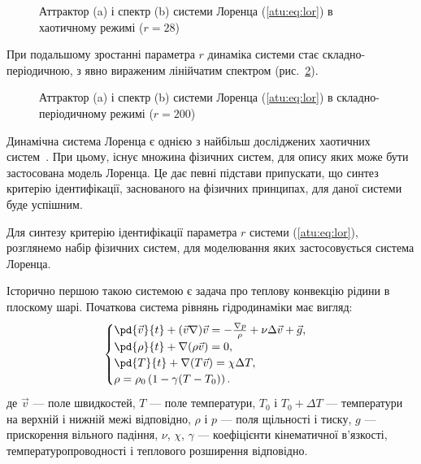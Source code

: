 \begin{figure}[htb!]
  \caption{Аттрактор (a) і спектр (b) системи Лоренца (\ref{atu:eq:lor}) в хаотичному режимі ($r = 28$)}
  \label{atu:f:lor_attractor_phase_chaos28}
\end{figure}

При подальшому зростанні параметра $r$ динаміка системи стає
складно-періодичною, з явно вираженим лінійчатим спектром
(рис.~\ref{atu:f:lor_attractor_phase_200}).

\begin{figure}[htb!]
  \caption{Аттрактор (a) і спектр (b) системи Лоренца (\ref{atu:eq:lor}) в складно-періодичному режимі ($r = 200$)}
\label{atu:f:lor_attractor_phase_200}
\end{figure}



Динамічна система Лоренца є однією з найбільш досліджених
хаотичних систем~\cite{neimark_stoch_chaos_vibro}. При цьому, існує множина
фізичних систем, для опису яких може бути застосована модель
Лоренца. Це дає певні підстави припускати, що синтез критерію
ідентифікації, заснованого на фізичних принципах, для даної
системи буде успішним.


Для синтезу критерію ідентифікації параметра
$r$ системи (\ref{atu:eq:lor}), розглянемо набір фізичних систем, для
моделювання яких застосовується система Лоренца.

Історично першою такою системою є задача про теплову
конвекцію рідини в плоскому шарі.
%
Початкова система рівнянь гідродинаміки має вигляд:
%
%
\begin{equation}
\begin{cases}
  \pd{\vec{v}}{t} + ( \vec{v} \nabla ) \vec{v} = - \frac{\nabla p}{\rho} + \nu \Delta \vec{v} + \vec{g}, \\
  \pd{\rho}{t} + \nabla ( \rho \vec{v} ) = 0 , \\
  \pd{T}{t} +\nabla ( T \vec{v} ) = \chi \Delta T , \\
  \rho = \rho_0 \left( 1 - \gamma (T - T_0) \right) .
\end{cases}
\label{atu:eq:lor_gidro}
\end{equation}
%
де
$\Vec{v} $ --- поле швидкостей,
$T $ --- поле температури,
$T_0 $ і $ T_0 + \Delta T $ --- температури на верхній і нижній межі відповідно,
$\rho $ і $ p $ --- поля щільності і тиску,
$g $ --- прискорення вільного падіння,
$\nu $,
$\chi $,
$\gamma $ --- коефіцієнти кінематичної в'язкості,
температуропроводності і теплового розширення відповідно.

